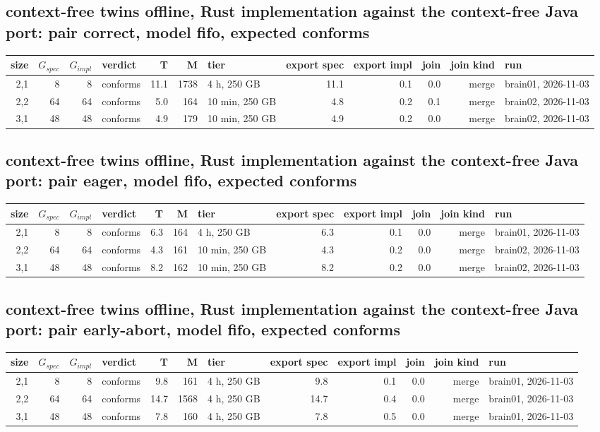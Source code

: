 \documentclass[10pt]{article}
\begin{document}
\subsection*{context-free twins offline, Rust implementation against the context-free Java port: pair \textsf{correct}, model fifo, expected conforms}
\begin{longtable}{@{}rrrlrrlrrrrl@{}}
\toprule
size & $G_{\mathit{spec}}$ & $G_{\mathit{impl}}$ & verdict & T & M & tier & export spec & export impl & join & join kind & run \\
\midrule
\endhead
\color{blue} 2,1 & 8 & 8 & conforms & 11.1 & 1738 & 4 h, 250 GB & 11.1 & 0.1 & 0.0 & merge & brain01, 2026-11-03 \\
\color{blue} 2,2 & 64 & 64 & conforms & 5.0 & 164 & 10 min, 250 GB & 4.8 & 0.2 & 0.1 & merge & brain02, 2026-11-03 \\
\color{blue} 3,1 & 48 & 48 & conforms & 4.9 & 179 & 10 min, 250 GB & 4.9 & 0.2 & 0.0 & merge & brain02, 2026-11-03 \\
\bottomrule
\end{longtable}
\subsection*{context-free twins offline, Rust implementation against the context-free Java port: pair \textsf{eager}, model fifo, expected conforms}
\begin{longtable}{@{}rrrlrrlrrrrl@{}}
\toprule
size & $G_{\mathit{spec}}$ & $G_{\mathit{impl}}$ & verdict & T & M & tier & export spec & export impl & join & join kind & run \\
\midrule
\endhead
\color{blue} 2,1 & 8 & 8 & conforms & 6.3 & 164 & 4 h, 250 GB & 6.3 & 0.1 & 0.0 & merge & brain01, 2026-11-03 \\
\color{blue} 2,2 & 64 & 64 & conforms & 4.3 & 161 & 10 min, 250 GB & 4.3 & 0.2 & 0.0 & merge & brain02, 2026-11-03 \\
\color{blue} 3,1 & 48 & 48 & conforms & 8.2 & 162 & 10 min, 250 GB & 8.2 & 0.2 & 0.0 & merge & brain02, 2026-11-03 \\
\bottomrule
\end{longtable}
\subsection*{context-free twins offline, Rust implementation against the context-free Java port: pair \textsf{early-abort}, model fifo, expected conforms}
\begin{longtable}{@{}rrrlrrlrrrrl@{}}
\toprule
size & $G_{\mathit{spec}}$ & $G_{\mathit{impl}}$ & verdict & T & M & tier & export spec & export impl & join & join kind & run \\
\midrule
\endhead
\color{blue} 2,1 & 8 & 8 & conforms & 9.8 & 161 & 4 h, 250 GB & 9.8 & 0.1 & 0.0 & merge & brain01, 2026-11-03 \\
\color{blue} 2,2 & 64 & 64 & conforms & 14.7 & 1568 & 4 h, 250 GB & 14.7 & 0.4 & 0.0 & merge & brain01, 2026-11-03 \\
\color{blue} 3,1 & 48 & 48 & conforms & 7.8 & 160 & 4 h, 250 GB & 7.8 & 0.5 & 0.0 & merge & brain01, 2026-11-03 \\
\bottomrule
\end{longtable}
\end{document}
